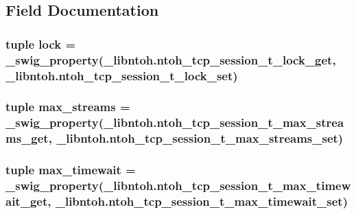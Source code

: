 \subsection{Field Documentation}
\hypertarget{classlibntoh_1_1ntoh__tcp__session__t_a871c7bf899334194698c2a3bced5e064}{
\subsubsection[{lock}]{\setlength{\rightskip}{0pt plus 5cm}tuple lock = {\bf \-\_\-swig\-\_\-property}(\-\_\-libntoh.\-ntoh\-\_\-tcp\-\_\-session\-\_\-t\-\_\-lock\-\_\-get, \-\_\-libntoh.\-ntoh\-\_\-tcp\-\_\-session\-\_\-t\-\_\-lock\-\_\-set)\hspace{0.3cm}{\ttfamily [static]}}}\label{classlibntoh_1_1ntoh__tcp__session__t_a871c7bf899334194698c2a3bced5e064}
\hypertarget{classlibntoh_1_1ntoh__tcp__session__t_ab08551f389ac2ec08b906a250a850739}{
\subsubsection[{max\-\_\-streams}]{\setlength{\rightskip}{0pt plus 5cm}tuple max\-\_\-streams = {\bf \-\_\-swig\-\_\-property}(\-\_\-libntoh.\-ntoh\-\_\-tcp\-\_\-session\-\_\-t\-\_\-max\-\_\-streams\-\_\-get, \-\_\-libntoh.\-ntoh\-\_\-tcp\-\_\-session\-\_\-t\-\_\-max\-\_\-streams\-\_\-set)\hspace{0.3cm}{\ttfamily [static]}}}\label{classlibntoh_1_1ntoh__tcp__session__t_ab08551f389ac2ec08b906a250a850739}
\hypertarget{classlibntoh_1_1ntoh__tcp__session__t_ad01cf9ea23f35bfa4d5bab3c0f182e42}{
\subsubsection[{max\-\_\-timewait}]{\setlength{\rightskip}{0pt plus 5cm}tuple max\-\_\-timewait = {\bf \-\_\-swig\-\_\-property}(\-\_\-libntoh.\-ntoh\-\_\-tcp\-\_\-session\-\_\-t\-\_\-max\-\_\-timewait\-\_\-get, \-\_\-libntoh.\-ntoh\-\_\-tcp\-\_\-session\-\_\-t\-\_\-max\-\_\-timewait\-\_\-set)\hspace{0.3cm}{\ttfamily [static]}}}\label{classlibntoh_1_1ntoh__tcp__session__t_ad01cf9ea23f35bfa4d5bab3c0f182e42}
